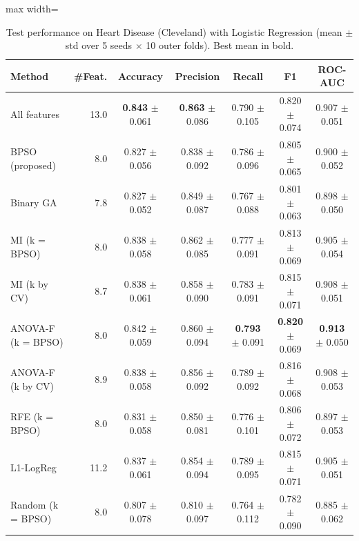 \begin{table}[!t]
\centering
\caption{Test performance on Heart Disease (Cleveland) with Logistic Regression (mean $\pm$ std over 5 seeds $\times$ 10 outer folds). Best mean in bold.}
\label{tab:results_heart_cleveland}
\footnotesize
\setlength{\tabcolsep}{4pt}
\begin{adjustbox}{max width=\linewidth}
\begin{tabular}{lrccccc}
\toprule
\textbf{Method} & \textbf{\#Feat.} & \textbf{Accuracy} & \textbf{Precision} & \textbf{Recall} & \textbf{F1} & \textbf{ROC-AUC} \\
\midrule
All features & 13.0 & \textbf{0.843} $\pm$ 0.061 & \textbf{0.863} $\pm$ 0.086 & 0.790 $\pm$ 0.105 & 0.820 $\pm$ 0.074 & 0.907 $\pm$ 0.051 \\
BPSO (proposed) & 8.0 & 0.827 $\pm$ 0.056 & 0.838 $\pm$ 0.092 & 0.786 $\pm$ 0.096 & 0.805 $\pm$ 0.065 & 0.900 $\pm$ 0.052 \\
Binary GA & 7.8 & 0.827 $\pm$ 0.052 & 0.849 $\pm$ 0.087 & 0.767 $\pm$ 0.088 & 0.801 $\pm$ 0.063 & 0.898 $\pm$ 0.050 \\
MI (k = BPSO) & 8.0 & 0.838 $\pm$ 0.058 & 0.862 $\pm$ 0.085 & 0.777 $\pm$ 0.091 & 0.813 $\pm$ 0.069 & 0.905 $\pm$ 0.054 \\
MI (k by CV) & 8.7 & 0.838 $\pm$ 0.061 & 0.858 $\pm$ 0.090 & 0.783 $\pm$ 0.091 & 0.815 $\pm$ 0.071 & 0.908 $\pm$ 0.051 \\
ANOVA-F (k = BPSO) & 8.0 & 0.842 $\pm$ 0.059 & 0.860 $\pm$ 0.094 & \textbf{0.793} $\pm$ 0.091 & \textbf{0.820} $\pm$ 0.069 & \textbf{0.913} $\pm$ 0.050 \\
ANOVA-F (k by CV) & 8.9 & 0.838 $\pm$ 0.058 & 0.856 $\pm$ 0.092 & 0.789 $\pm$ 0.092 & 0.816 $\pm$ 0.068 & 0.908 $\pm$ 0.053 \\
RFE (k = BPSO) & 8.0 & 0.831 $\pm$ 0.058 & 0.850 $\pm$ 0.081 & 0.776 $\pm$ 0.101 & 0.806 $\pm$ 0.072 & 0.897 $\pm$ 0.053 \\
L1-LogReg & 11.2 & 0.837 $\pm$ 0.061 & 0.854 $\pm$ 0.094 & 0.789 $\pm$ 0.095 & 0.815 $\pm$ 0.071 & 0.905 $\pm$ 0.051 \\
Random (k = BPSO) & 8.0 & 0.807 $\pm$ 0.078 & 0.810 $\pm$ 0.097 & 0.764 $\pm$ 0.112 & 0.782 $\pm$ 0.090 & 0.885 $\pm$ 0.062 \\
\bottomrule
\end{tabular}
\end{adjustbox}
\end{table}
